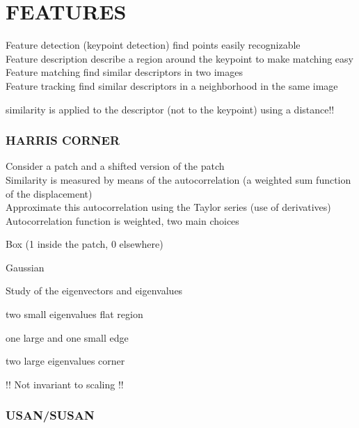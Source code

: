 \documentclass[11pt,english]{article}
\begin{document}
\section{FEATURES}
							
Feature detection (keypoint detection) \makebox[0.5cm]{\textrightarrow} find points easily recognizable \\
Feature description \makebox[0.5cm]{\textrightarrow} describe a region around the keypoint to make matching easy \\
Feature matching \makebox[0.5cm]{\textrightarrow} find similar descriptors in two images \\
Feature tracking \makebox[0.5cm]{\textrightarrow} find similar descriptors in a neighborhood in the same image

\medskip

similarity is applied to the descriptor (not to the keypoint) using a distance!! 

\subsubsection*{HARRIS CORNER}
Consider a patch and a shifted version of the patch \\
Similarity is measured by means of the autocorrelation (a weighted sum function of the displacement) \\
Approximate this autocorrelation using the Taylor series (use of derivatives) \\
Autocorrelation function is weighted, two main choices \par
    \makebox[1.5cm]{\textrightarrow} Box (1 inside the patch, 0 elsewhere)\par
    \makebox[1.5cm]{\textrightarrow} Gaussian\par
Study of the eigenvectors and eigenvalues \par
    \makebox[1.5cm]{\textrightarrow} two small eigenvalues \makebox[0.5cm]{\textrightarrow} flat region\par
    \makebox[1.5cm]{\textrightarrow} one large and one small \makebox[0.5cm]{\textrightarrow} edge\par
    \makebox[1.5cm]{\textrightarrow} two large eigenvalues \makebox[0.5cm]{\textrightarrow} corner\par

!! Not invariant to scaling !!

\subsubsection*{USAN/SUSAN}
\end{document}
